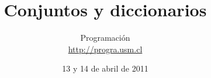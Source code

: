 \documentclass[12pt]{beamer}
\title{Conjuntos y diccionarios}
\author{
  Programación \\ \url{http://progra.usm.cl}
}
\date{13 y 14 de abril de 2011}
\begin{document}
  \begin{frame}
    \maketitle
  \end{frame}
\end{document}
